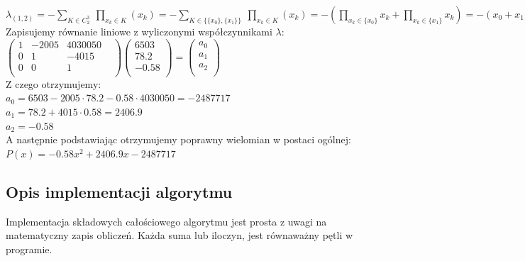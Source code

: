 \documentclass[a4paper,12pt]{article}
\newcommand{\id}{\noindent}
\newcommand{\el}[2]{\lambda_{(#1, #2)}}
\begin{document}
$\el{1}{2} = -\sum\limits_{K \in C^3_{2}} \ \prod\limits_{x_k \in K} \left( x_k \right) = -\sum\limits_{K \in \{ \{x_0\}, \{x_1\} \}} \ \prod\limits_{x_k \in K} \left( x_k \right) = -\left( \prod\limits_{x_k \in \{x_0\}}x_k + \prod\limits_{x_k \in \{x_1\}}x_k \right) = -(x_0 + x_1) = -4015$ \\



\id
Zapisujemy równanie liniowe z wyliczonymi współczynnikami $\lambda$: \\

$
\begin{pmatrix}
1 & -2005 & 4030050 \\
0 & 1 & -4015 \\
0 & 0 & 1 &\\
\end{pmatrix}
\begin{pmatrix}
6503 \\
78.2 \\
-0.58 \\
\end{pmatrix}
=
\begin{pmatrix}
a_0 \\
a_1 \\
a_2 \\
\end{pmatrix}
$ \\

\id
Z czego otrzymujemy: \\

$a_0 = 6503 - 2005\cdot 78.2 - 0.58\cdot 4030050 = -2487717$ \\

$a_1 = 78.2 + 4015\cdot 0.58 = 2406.9$ \\

$a_2 = -0.58$ \\

\id
A następnie podstawiając otrzymujemy poprawny wielomian w postaci ogólnej: \\

$P(x) = -0.58x^2 + 2406.9x - 2487717$

\subsection{Opis implementacji algorytmu}

\id
Implementacja składowych całościowego algorytmu jest prosta z uwagi na matematyczny zapis obliczeń. Każda suma lub iloczyn, jest równaważny pętli w programie. \\
\end{document}

